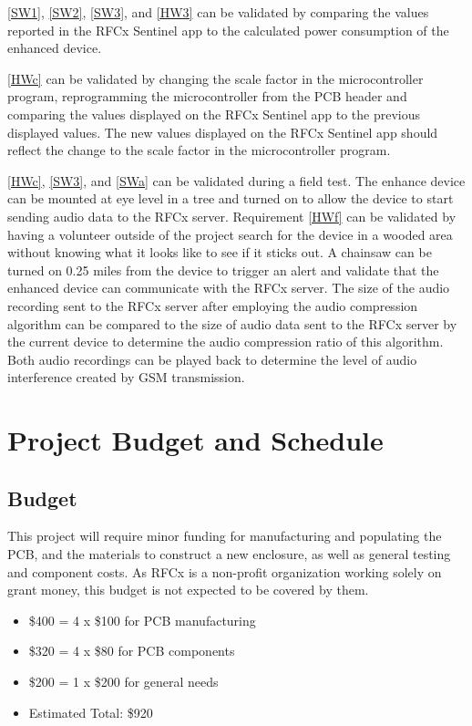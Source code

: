 \documentclass{article}
\numberwithin{figure}{section}
\numberwithin{equation}{section}
\begin{document}
{\ref{SW1}, \ref{SW2}, \ref{SW3}, and \ref{HW3} can be validated by comparing the values reported in the RFCx Sentinel app to the calculated power consumption of the enhanced device.

\ref{HWc} can be validated by changing the scale factor in the microcontroller program, reprogramming the microcontroller from the PCB header and comparing the values displayed on the RFCx Sentinel app to the previous displayed values. The new values displayed on the RFCx Sentinel app should reflect the change to the scale factor in the microcontroller program.

\ref{HWc}, \ref{SW3}, and \ref{SWa} can be validated during a field test. The enhance device can be mounted at eye level in a tree and turned on to allow the device to start sending audio data to the RFCx server. Requirement \ref{HWf} can be validated by having a volunteer outside of the project search for the device in a wooded area without knowing what it looks like to see if it sticks out. A chainsaw can be turned on 0.25 miles from the device to trigger an alert and validate that the enhanced device can communicate with the RFCx server. The size of the audio recording sent to the RFCx server after employing the audio compression algorithm can be compared to the size of audio data sent to the RFCx server by the current device to determine the audio compression ratio of this algorithm. Both audio recordings can be played back to determine the level of audio interference created by GSM transmission.

\section{Project Budget and Schedule} \label{sect:budgetandschedule}
\subsection{Budget} \label{sect:budget}
This project will require minor funding for manufacturing and populating the PCB, and the materials to construct a new enclosure, as well as general testing and component costs. As RFCx is a non-profit organization working solely on grant money, this budget is not expected to be covered by them.
\begin{itemize}
\item \$400 = 4 x \$100 for PCB manufacturing
\item \$320 = 4 x \$80 for PCB components
\item \$200 = 1 x \$200 for general needs
\item Estimated Total: \$920
\end{itemize}

}
\end{document}
